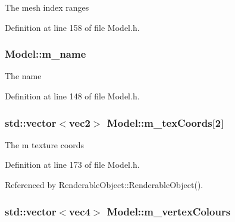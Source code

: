 The mesh index ranges 



Definition at line 158 of file Model.\+h.

\subsubsection[{\texorpdfstring{m\+\_\+name}{m_name}}]{ Model\+::m\+\_\+name\hspace{0.3cm}{\ttfamily [private]}}\hypertarget{class_model_a862ab593f7a9e07ed55fd734b7ea6abd}{}\label{class_model_a862ab593f7a9e07ed55fd734b7ea6abd}


The name 



Definition at line 148 of file Model.\+h.

\subsubsection[{\texorpdfstring{m\+\_\+tex\+Coords}{m_texCoords}}]{\setlength{\rightskip}{0pt plus 5cm}std\+::vector$<${\bf vec2}$>$ Model\+::m\+\_\+tex\+Coords\mbox{[}2\mbox{]}\hspace{0.3cm}{\ttfamily [private]}}\hypertarget{class_model_acfac7d57325506a10c5ce88a01d97084}{}\label{class_model_acfac7d57325506a10c5ce88a01d97084}


The m texture coords 



Definition at line 173 of file Model.\+h.



Referenced by Renderable\+Object\+::\+Renderable\+Object().

\subsubsection[{\texorpdfstring{m\+\_\+vertex\+Colours}{m_vertexColours}}]{\setlength{\rightskip}{0pt plus 5cm}std\+::vector$<${\bf vec4}$>$ Model\+::m\+\_\+vertex\+Colours\hspace{0.3cm}{\ttfamily [private]}}\hypertarget{class_model_a91c387e31388fe3c51bbbb69128d5783}{}\label{class_model_a91c387e31388fe3c51bbbb69128d5783}


